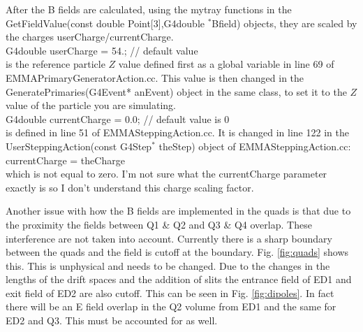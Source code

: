 \documentclass[letter,11pt]{article}
\newcommand{\filefont}[1]{{\scriptsize\ttfamily\selectfont #1}\xspace}
\begin{document}
After the B fields are calculated, using the \filefont{mytray} functions in the \filefont{GetFieldValue(const double Point[3],G4double $^{*}$Bfield)} objects, they are scaled by the charges \filefont{userCharge/currentCharge}.\\\filefont{G4double userCharge = 54.; // default value}\\
is the reference particle $Z$ value defined first as a global variable in line 69 of EMMAPrimaryGeneratorAction.cc. This value is then changed in the \filefont{GeneratePrimaries(G4Event* anEvent)} object in the same class, to set it to the $Z$ value of the particle you are simulating.\\
\filefont{G4double currentCharge = 0.0; // default value is 0}\\
is defined in line 51 of EMMASteppingAction.cc. It is changed in line 122 in the \filefont{UserSteppingAction(const G4Step$^{*}$ theStep)} object of EMMASteppingAction.cc:\\
\filefont{currentCharge = theCharge}\\
which is not equal to zero. I'm not sure what the \filefont{currentCharge} parameter exactly is so I don't understand this charge scaling factor.

Another issue with how the B fields are implemented in the quads is that due to the proximity the fields between Q1 \& Q2 and Q3 \& Q4 overlap. These interference are not taken into account. Currently there is a sharp boundary between the quads and the field is cutoff at the boundary. Fig. \ref{fig:quads} shows this. This is unphysical and needs to be changed. Due to the changes in the lengths of the drift spaces and the addition of slits the entrance field of ED1 and exit field of ED2 are also cutoff. This can be seen in Fig. \ref{fig:dipoles}. In fact there will be an E field overlap in the Q2 volume from ED1 and the same for ED2 and Q3. This must be accounted for as well.
\end{document}
